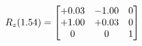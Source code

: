 \documentclass[preview]{standalone}
\begin{document}
\begin{align*}
\special{dvisvgm:raw <g id='unique000'>}R_{z}(1.54) = \begin{bmatrix}+0.03 & -1.00 & 0 \\+1.00 & +0.03 & 0 \\0 & 0 & 1\end{bmatrix}\special{dvisvgm:raw </g>}
\end{align*}
\end{document}

